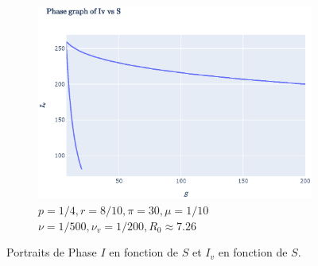 \documentclass[11pt]{article}
\begin{document}
\begin{figure}[th]
	\begin{subfigure}{0.49\textwidth}
	  \centering
	  \includegraphics[width=\linewidth]{../figures/ex2_IvS_2.eps}  
	  \caption{$p = 1/4,
	  		r = 8/10, 
	  		\pi = 30,
	  		\mu = 1/10$\\
	  		$\nu = 1/500,
	  		\nu_v = 1/200, R_0 \approx 7.26$}
	\end{subfigure}

	\centering
	\caption{Portraits de Phase $I$ en fonction de $S$ et $I_v$ en fonction de $S$. 
	}
	\label{fig:ex2 IS}
\end{figure}
\end{document}
